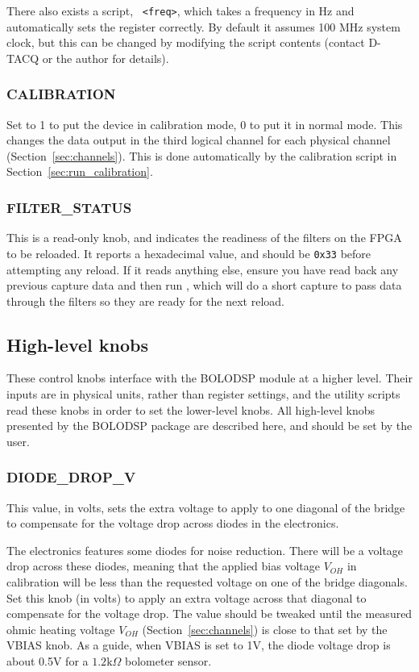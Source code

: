 \documentclass[12pt,a4paper]{article}
\begin{document}
There also exists a script, \mbox{~\texttt{<freq>}}, which takes a frequency in Hz and automatically sets the register
correctly. By default it assumes 100 MHz system clock, but this can be changed by modifying the script contents (contact D-TACQ or the author for
details).

\subsubsection{CALIBRATION}
Set to 1 to put the device in calibration mode, 0 to put it in normal mode. This changes the data output in the third logical channel for each physical
channel (Section~\ref{sec:channels}). This is done automatically by the calibration script in Section~\ref{sec:run_calibration}.

\subsubsection{FILTER{\_}STATUS}
This is a read-only knob, and indicates the readiness of the filters on the FPGA to be reloaded. It reports a hexadecimal value, and should be
\texttt{0x33} before attempting any reload. If it reads anything else, ensure you have read back any previous capture data and then run %
\mbox{}, which will do a short capture to pass data through the filters so they are ready for the next reload.

\subsection{High-level knobs}%
\label{sec:knobshl}
These control knobs interface with the BOLODSP module at a higher level. Their inputs are in physical units, rather than register settings, and the
utility scripts read these knobs in order to set the lower-level knobs. All high-level knobs presented by the BOLODSP package are described here, and
should be set by the user.

\subsubsection{DIODE{\_}DROP{\_}V}
This value, in volts, sets the extra voltage to apply to one diagonal of the bridge to compensate for the voltage drop across diodes in the electronics.

The electronics features some diodes for noise reduction. There will be a voltage drop across these diodes, meaning that the applied bias voltage $V_{OH}$
in calibration will be less than the requested voltage on one of the bridge diagonals. Set this knob (in volts) to apply an extra voltage across that
diagonal to compensate for the voltage drop. The value should be tweaked until the measured ohmic heating voltage $V_{OH}$ (Section~\ref{sec:channels}) is
close to that set by the VBIAS knob. As a guide, when VBIAS is set to 1V, the diode voltage drop is about 0.5V for a $1.2\mathrm{k}\Omega$ bolometer
sensor.
\end{document}
